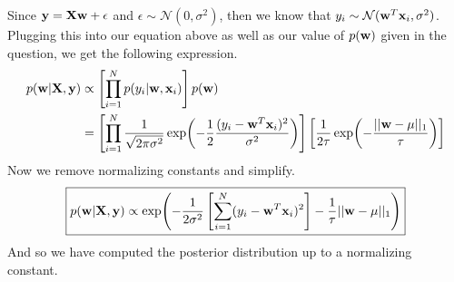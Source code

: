 \documentclass[submit]{harvardml}
\begin{document}
Since $\vb{y} = \vb{X}\vb{w} + \epsilon$ and $\epsilon \sim \mathcal{N}(0, \sigma^2)$, then we know that $y_i \sim \mathcal{N}(\vb{w}^T\vb{x}_i, \sigma^2)$. Plugging this into our equation above as well as our value of $p(\vb{w})$ given in the question, we get the following expression.
\begin{align*}
    p(\vb{w} | \vb{X}, \vb{y}) &\propto \left[ \prod_{i=1}^N p(y_i | \vb{w}, \vb{x}_i) \right] p(\vb{w}) \\
    &= \left[ \prod_{i=1}^N \frac{1}{\sqrt{2 \pi \sigma^2}} \exp(-\frac{1}{2} \frac{(y_i - \vb{w}^T\vb{x}_i)^2}{\sigma^2})\right] \left[ \frac{1}{2 \tau} \exp(- \frac{||\vb{w} - \mu||_1}{\tau}) \right]
\end{align*}
Now we remove normalizing constants and simplify.
\begin{equation*}
    \boxed{p(\vb{w} | \vb{X}, \vb{y}) \propto \exp(-\frac{1}{2\sigma^2} \left[ \sum_{i=1}^N (y_i - \vb{w}^T \vb{x}_i)^2 \right] - \frac{1}{\tau} ||\vb{w} - \mu ||_1)}
\end{equation*}
And so we have computed the posterior distribution up to a normalizing constant.
\end{document}
